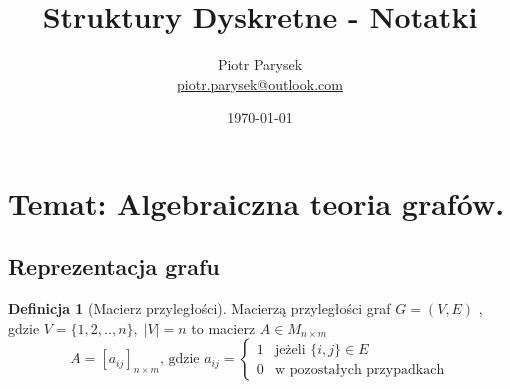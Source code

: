 \documentclass[a4paper,12pt]{article}
\title{Struktury Dyskretne - Notatki}
\author{Piotr Parysek\\
\href{mailto:piotr.parysek@outlook.com}{piotr.parysek@outlook.com} }
\date{\today}
\theoremstyle{definition}%
\theoremstyle{definition}
\newtheorem{definition}{Definicja}%
\theoremstyle{problem}
\begin{document}
\maketitle

\tableofcontents
\section[Wykład 4: 16-III-2017 - Temat: Algebraiczna teoria grafów.]{Temat: Algebraiczna teoria grafów.}
\subsection{Reprezentacja grafu}
\begin{definition}[Macierz przyległości] Macierzą przyległości graf $G=(V,E)$ , gdzie $V=\{1,2,..,n\},\; |V|=n$ to macierz $A\in M_{n\times m}$
$$A=[a_{ij}]_{n\times m}\text{, gdzie } a_{ij}=\left\{\begin{matrix}
1 & \text{jeżeli } \{i,j\}\in E\\
0 & \text{w pozostałych przypadkach}
\end{matrix}\right.$$
\end{definition}
\end{document}
